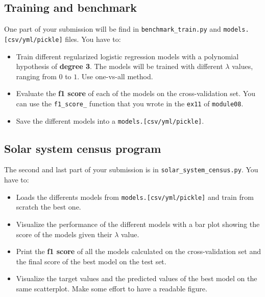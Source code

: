 \documentclass{42-en}
\begin{document}
\subsection*{Training and benchmark}
One part of your submission will be find in \texttt{benchmark\_train.py} and \texttt{models.[csv/yml/pickle]} files.
You have to:
\begin{itemize}
  \item Train different regularized logistic regression models with a polynomial hypothesis of \textbf{degree 3}.
        The models will be trained with different $\lambda$ values, ranging from $0$ to $1$.
        Use one-vs-all method.
  \item Evaluate the \textbf{f1 score} of each of the models on the cross-validation set.
        You can use the \texttt{f1\_score\_} function that you wrote in the \texttt{ex11} of \texttt{module08}.
  \item Save the different models into a \texttt{models.[csv/yml/pickle]}.
\end{itemize}

\subsection*{Solar system census program}
The second and last part of your submission is in \texttt{solar\_system\_census.py}. You have to:
\begin{itemize}
  \item Loads the differents models from \texttt{models.[csv/yml/pickle]} and train from scratch the best one.
  \item Visualize the performance of the different models with a bar plot showing the score of the models given their $\lambda$ value.
  \item Print the \textbf{f1 score} of all the models calculated on the cross-validation set and the final score of the best model on
        the test set.
  \item Visualize the target values and the predicted values of the best model on the same scatterplot. Make some effort to have a readable figure.
\end{itemize}


\newpage
\end{document}
